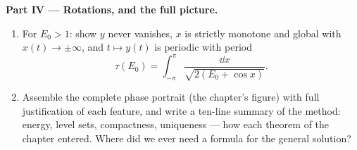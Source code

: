 \begin{problem}
\medskip
\noindent\textbf{Part IV --- Rotations, and the full
picture.}
\begin{enumerate}[resume]
  \item For $E_0 > 1$: show $y$ never vanishes, $x$ is
        strictly monotone and global with $x(t) \to
        \pm\infty$, and $t \mapsto y(t)$ is periodic with
        period
        \[
        \tau(E_0) = \int_{-\pi}^{\pi}
        \frac{\dd x}{\sqrt{2(E_0 + \cos x)}} .
        \]
  \item Assemble the complete phase portrait (the chapter's
        figure) with full justification of each feature, and
        write a ten-line summary of the method: energy,
        level sets, compactness, uniqueness --- how each
        theorem of the chapter entered. Where did we ever
        need a formula for the general solution?
\end{enumerate}


\end{problem}
